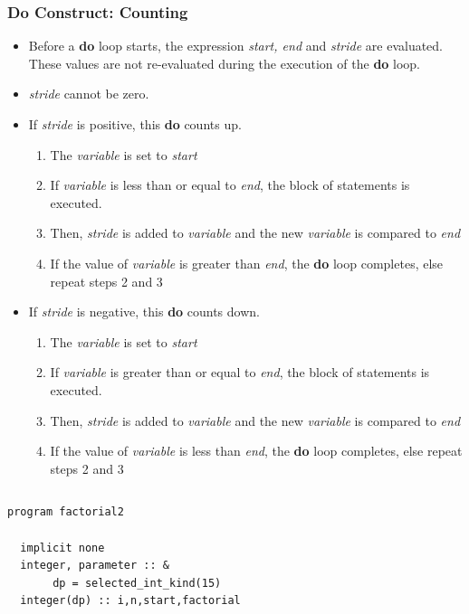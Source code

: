 \documentclass[slidestop,mathserif,compress,xcolor=svgnames]{beamer}
\newenvironment{eblock}[0]
{
\begin{beamerboxesrounded}[upper=uppercol2,lower=lowercol2,shadow=true]}
{\end{beamerboxesrounded}}
\begin{document}
\begin{frame}
  \frametitle{\small Do Construct: Counting}
  \begin{itemize}
    \item Before a \textbf{do} loop starts, the expression \textit{start, end} and \textit{stride} are evaluated. These values are not re-evaluated during the execution of the \textbf{do} loop.
    \item \textit{stride} cannot be zero.
    \item If \textit{stride} is positive, this \textbf{do} counts up.
    \begin{enumerate}
      \item The \textit{variable} is set to \textit{start}
      \item If \textit{variable} is less than or equal to \textit{end}, the block of statements is executed.
      \item Then, \textit{stride} is added to \textit{variable} and the new \textit{variable} is compared to \textit{end}
      \item If the value of \textit{variable} is greater than \textit{end}, the \textbf{do} loop completes, else repeat steps 2 and 3
    \end{enumerate}
    \item If \textit{stride} is negative, this \textbf{do} counts down.
    \begin{enumerate}
      \item The \textit{variable} is set to \textit{start}
      \item If \textit{variable} is greater than or equal to \textit{end}, the block of statements is executed.
      \item Then, \textit{stride} is added to \textit{variable} and the new \textit{variable} is compared to \textit{end}
      \item If the value of \textit{variable} is less than \textit{end}, the \textbf{do} loop completes, else repeat steps 2 and 3
    \end{enumerate}
  \end{itemize}
  \framebreak
  \begin{columns}
    \column{5.5cm}
    \begin{eblock}{}
    {\fontsize{5}{6}
    \begin{verbatim}
program factorial2

  implicit none
  integer, parameter :: &
       dp = selected_int_kind(15)
  integer(dp) :: i,n,start,factorial


\end{verbatim}}
\end{eblock}
\end{columns}
\end{frame}
\end{document}
